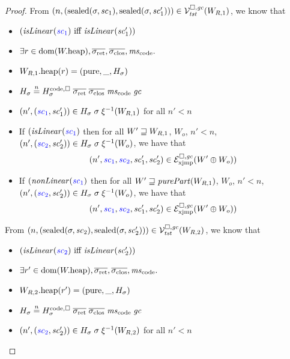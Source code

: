 \begin{proof}
  From $\npair{(\sealed{\sigma,\vsc_1},\sealed{\sigma,\vsc_1'})} \in \lrvg{\trust}(W_{R,1})$, we know that
  \begin{itemize}
  \item $(\isLinear{\src{\vsc_1}} \text{ iff } \isLinear{\vsc_1'})$ 
  \item $\exists r \in \dom(\pwheap), \sigrets,\sigcloss,\mscode \ldotp$ 
  \item $\pwheap[W_{R,1}](r) = (\pure,\_,H_\sigma)$ 
  \item $H_\sigma \nequal H^\mathrm{code,\square}_\sigma \; \sigrets \; \sigcloss \; \mscode \; \gc$
  \item $\npair[n']{\stpair[.]{\vsc_1}{\vsc_1'}} \in H_\sigma \; \sigma \; \xi^{-1}(W_{R,1})$ for all $n' < n$
  \item If $(\isLinear{\src{\vsc_1}}$ then for all $W' \future W_{R,1}$, $W_o$, $n' < n$, $\npair[n']{\stpair[.]{\vsc_2}{\vsc_2'}} \in H_\sigma \; \sigma \; \xi^{-1}(W_o)$, we have that
    \begin{equation*}
      \npair[n']{\src{\vsc_1},\src{\vsc_2},\vsc_1',\vsc_2'} \in \lrexj(W'\oplus W_o))
    \end{equation*}
  \item If $(\nonLinear{\src{\vsc_1}}$ then for all $W' \future \purePart{W_{R,1}}$, $W_o$, $n' < n$, $\npair[n']{\stpair[.]{\vsc_2}{\vsc_2'}} \in H_\sigma \; \sigma \; \xi^{-1}(W_o)$, we have that
    \begin{equation*}
      \npair[n']{\src{\vsc_1},\src{\vsc_2},\vsc_1',\vsc_2'} \in \lrexj(W'\oplus W_o))
    \end{equation*}
  \end{itemize}

  From $\npair{(\sealed{\sigma,\vsc_2},\sealed{\sigma,\vsc_2'})} \in \lrvg{\trust}(W_{R,2})$, we know that
  \begin{itemize}
  \item $(\isLinear{\src{\vsc_2}} \text{ iff } \isLinear{\vsc_2'})$ 
  \item $\exists r' \in \dom(\pwheap), \sigrets,\sigcloss,\mscode \ldotp$ 
  \item $\pwheap[W_{R,2}](r') = (\pure,\_,H_\sigma)$ 
  \item $H_\sigma \nequal H^\mathrm{code,\square}_\sigma \; \sigrets \; \sigcloss \; \mscode \; \gc$
  \item $\npair[n']{\stpair[.]{\vsc_2}{\vsc_2'}} \in H_\sigma \; \sigma \; \xi^{-1}(W_{R,2})$ for all $n' < n$
  \end{itemize}


\end{proof}
